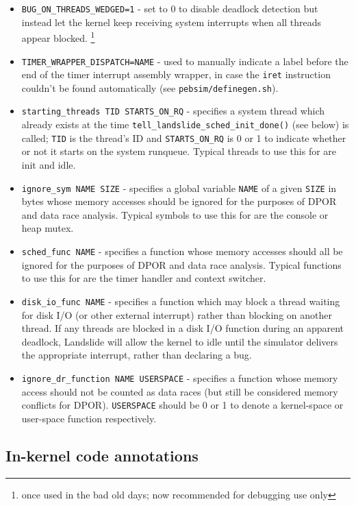 \begin{itemize}
	\item {\tt BUG\_ON\_THREADS\_WEDGED=1} - set to 0 to disable deadlock detection but instead let the kernel keep receiving system interrupts when all threads appear blocked.%
		\footnote{once used in the bad old days; now recommended for debugging use only}
	\item {\tt TIMER\_WRAPPER\_DISPATCH=NAME} - used to manually indicate a label before the end of the timer interrupt assembly wrapper, in case the {\tt iret} instruction couldn't be found automatically (see {\tt pebsim/definegen.sh}).
	\item {\tt starting\_threads TID STARTS\_ON\_RQ} - specifies a system thread which already exists at the time {\tt tell\_landslide\_sched\_init\_done()} (see below) is called; {\tt TID} is the thread's ID and {\tt STARTS\_ON\_RQ} is 0 or 1 to indicate whether or not it starts on the system runqueue.
		Typical threads to use this for are init and idle.
	\item {\tt ignore\_sym NAME SIZE} - specifies a global variable {\tt NAME} of a given {\tt SIZE} in bytes whose memory accesses should be ignored for the purposes of DPOR and data race analysis.
		Typical symbols to use this for are the console or heap mutex.
	\item {\tt sched\_func NAME} - specifies a function whose memory accesses should all be ignored for the purposes of DPOR and data race analysis.
		Typical functions to use this for are the timer handler and context switcher.
	\item {\tt disk\_io\_func NAME} - specifies a function which may block a thread waiting for disk I/O (or other external interrupt) rather than blocking on another thread.
		If any threads are blocked in a disk I/O function during an apparent deadlock,
		Landslide will allow the kernel to idle until the simulator delivers the appropriate interrupt,
		rather than declaring a bug.
	\item {\tt ignore\_dr\_function NAME USERSPACE} - specifies a function whose memory access should not be counted as data races (but still be considered memory conflicts for DPOR).
		{\tt USERSPACE} should be 0 or 1 to denote a kernel-space or user-space function respectively.
\end{itemize}


\subsection{In-kernel code annotations}

